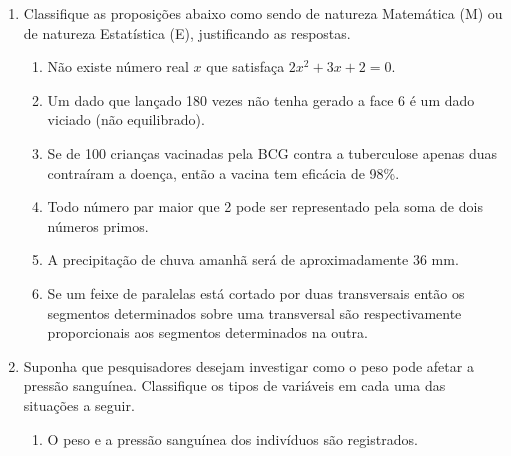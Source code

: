 {{\begin{enumerate}
\begin{enumerate}
\item {} 
Uma amostra de 250 residentes de uma cidade indicou que 45 destes são funcionários públicos. Assim 18\% desses 250 residentes trabalham para o governo.

\item {} 
A média de idade de trabalhadores formais obtida de uma amostra de 380 habitantes de Nova Iguaçu foi de 34 anos.

\item {} 
Numa pesquisa feita com 2000 habitantes da Grande São Paulo, 768 disseram fazer uso regular de sacola ecológica pessoal em suas compras de supermercado.  A prefeitura conclui que mais de um terço dos habitantes da Grande São Paulo já aderiu à sacola ecológica.

\end{enumerate}

\item Classifique as proposições abaixo como sendo de natureza Matemática (M) ou de natureza Estatística (E), justificando as respostas.
\begin{enumerate}
\item {} 
Não existe número real \(x\) que satisfaça \(2x^2 + 3x + 2 = 0\).

\item {} 
Um dado que lançado 180 vezes não tenha gerado a face 6 é um dado viciado (não equilibrado).

\item {} 
Se de 100 crianças vacinadas pela BCG contra a tuberculose apenas duas contraíram a doença, então a vacina tem eficácia de 98\%.

\item {} 
Todo número par maior que 2 pode ser representado pela soma de dois números primos.

\item {} 
A precipitação de chuva amanhã será de aproximadamente 36 mm.

\item {} 
Se um feixe de paralelas está cortado por duas transversais então os segmentos determinados sobre uma transversal são respectivamente proporcionais aos segmentos determinados na outra.

\end{enumerate}

\item Suponha que pesquisadores desejam investigar como o peso pode afetar a pressão sanguínea. Classifique os tipos de variáveis em cada uma das situações a seguir.
\begin{enumerate}
\item {} 
O peso e a pressão sanguínea dos indivíduos são registrados.


\end{enumerate}
\end{enumerate}}}
